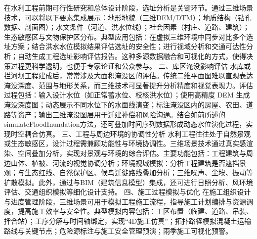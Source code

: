 {在水利工程前期可行性研究和总体设计阶段，选址分析是关键环节。通过三维场景技术，可以将以下要素集成展示：地形地貌（三维DEM/DTM）；地质结构（钻孔数据、剖面图）；水文条件（河道、洪水位线）；社会因素（村庄、道路、建筑）；生态敏感区与文物保护区分布。典型应用包括：在虚拟三维环境中同步对比多个选址方案；结合洪水水位模拟结果评估选址的安全性；进行视域分析和交通可达性分析；自动生成工程选址影响评估报告。这种多源数据融合和可视化的方式，使得决策过程更科学透明，也便于专家论证和公众参与。
二、库区淹没影响评估 水库或拦河坝工程建成后，常常涉及大面积淹没区的评估。传统二维平面图难以直观表达淹没深度、范围与地形关系，而三维技术可显著提升分析精度和视觉表现力。评估过程包括：输入设计水位（如正常蓄水位、校核洪水位）；使用高精度
DEM 生成淹没深度图；动态展示不同水位下的水面线演变；标注淹没区内的房屋、农田、道路等资产；输出三维淹没图层用于迁建补偿和风险沟通。结合如前所述的
simulateFloodInundation方法，还可叠加时间序列数据形成动态水位演化过程，实现时空耦合仿真。 三、工程与周边环境的协调性分析
水利工程往往处于自然景观或生态敏感区，设计过程需兼顾功能性与环境协调性。三维场景技术通过真实感渲染、空间叠加分析，实现对景观与环境的综合评估。主要功能包括：工程建筑与周边山体、植被、河流的视觉协调分析；环境视域模拟：分析工程建筑是否遮挡景观；与生态红线、自然保护区、候鸟迁徙路线叠加分析；三维噪声、尘埃、振动等扩散模拟。此外，通过与BIM（建筑信息模型）集成，还可进行日照分析、风环境评估、交通组织模拟等细化设计支持。
四、施工过程模拟与优化
在施工组织设计与进度管理阶段，三维场景可用于模拟工程施工流程，指导施工计划编排与资源调度，提高施工效率与安全性。典型模拟内容包括：工区布置（临建、道路、吊装、拌合站）；工序分解与时间轴绑定，实现``4D施工仿真''；拓扑路径模拟混凝土运输路线与关键节点；危险源标注与施工安全管理预演；雨季施工可视化预警。
}
